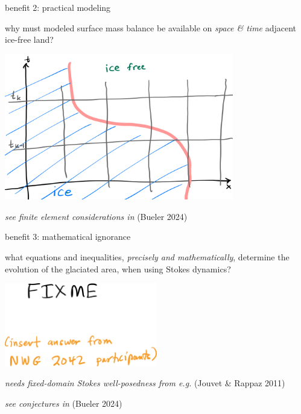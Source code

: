\documentclass[10pt,dvipsnames]{beamer}
\begin{document}
\begin{frame}{benefit 2: practical modeling}

why must modeled surface mass balance be available on \emph{space \& time} adjacent ice-free land?

\bigskip

\begin{center}
\includegraphics[width=0.75\textwidth]{smbcells}
\end{center}

\bigskip
{\footnotesize \emph{see finite element considerations in} (Bueler 2024)}
\end{frame}


\begin{frame}{benefit 3: mathematical ignorance}

what equations and inequalities, \emph{precisely and mathematically}, determine the evolution of the glaciated area, when using Stokes dynamics?

\bigskip

\begin{center}
\includegraphics[width=0.5\textwidth]{fixme2042}
\end{center}

\bigskip
{}

{\footnotesize \emph{needs fixed-domain Stokes well-posedness from e.g.} (Jouvet \& Rappaz 2011)}

{\footnotesize \emph{see conjectures in} (Bueler 2024)}
\end{frame}
\end{document}
